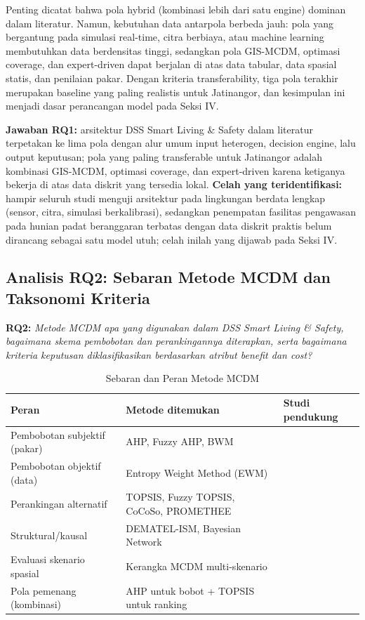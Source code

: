 \documentclass[conference]{IEEEtran}
\begin{document}
Penting dicatat bahwa pola hybrid (kombinasi lebih dari satu engine) dominan dalam literatur. Namun, kebutuhan data antarpola berbeda jauh: pola yang bergantung pada simulasi real-time, citra berbiaya, atau machine learning membutuhkan data berdensitas tinggi, sedangkan pola GIS-MCDM, optimasi coverage, dan expert-driven dapat berjalan di atas data tabular, data spasial statis, dan penilaian pakar. Dengan kriteria transferability, tiga pola terakhir merupakan baseline yang paling realistis untuk Jatinangor, dan kesimpulan ini menjadi dasar perancangan model pada Seksi IV.

\textbf{Jawaban RQ1:} arsitektur DSS Smart Living \& Safety dalam literatur terpetakan ke lima pola dengan alur umum input heterogen, decision engine, lalu output keputusan; pola yang paling transferable untuk Jatinangor adalah kombinasi GIS-MCDM, optimasi coverage, dan expert-driven karena ketiganya bekerja di atas data diskrit yang tersedia lokal. \textbf{Celah yang teridentifikasi:} hampir seluruh studi menguji arsitektur pada lingkungan berdata lengkap (sensor, citra, simulasi berkalibrasi), sedangkan penempatan fasilitas pengawasan pada hunian padat beranggaran terbatas dengan data diskrit praktis belum dirancang sebagai satu model utuh; celah inilah yang dijawab pada Seksi IV.

\subsection{Analisis RQ2: Sebaran Metode MCDM dan Taksonomi Kriteria}

\noindent\textbf{RQ2:} \textit{Metode MCDM apa yang digunakan dalam DSS Smart Living \& Safety, bagaimana skema pembobotan dan perankingannya diterapkan, serta bagaimana kriteria keputusan diklasifikasikan berdasarkan atribut benefit dan cost?}

\begin{table}[!t]
\caption{Sebaran dan Peran Metode MCDM}
\label{tab:metode}
\centering
\begin{tabular}{p{1.9cm}p{2.8cm}p{2.9cm}}
\toprule
\textbf{Peran} & \textbf{Metode ditemukan} & \textbf{Studi pendukung} \\
\midrule
Pembobotan subjektif (pakar) & AHP, Fuzzy AHP, BWM & \cite{ahmed2022,kanj2024,baddour2026,shiddiqy2025} \\
Pembobotan objektif (data) & Entropy Weight Method (EWM) & \cite{yuhang2025} \\
Perankingan alternatif & TOPSIS, Fuzzy TOPSIS, CoCoSo, PROMETHEE & \cite{kanj2024,baddour2026,almassawa2024} \\
Struktural/kausal & DEMATEL-ISM, Bayesian Network & \cite{zheng2025} \\
Evaluasi skenario spasial & Kerangka MCDM multi-skenario & \cite{kabashkin2025} \\
Pola pemenang (kombinasi) & AHP untuk bobot + TOPSIS untuk ranking & \cite{kanj2024} \\
\bottomrule
\end{tabular}
\end{table}
\end{document}
